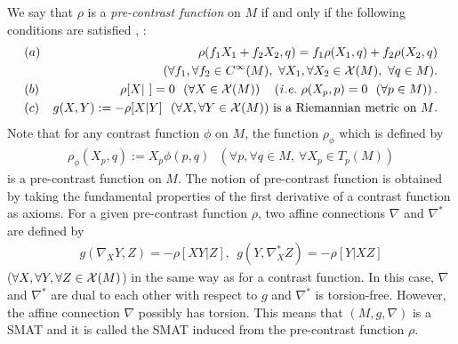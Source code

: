 \documentclass[graybox]{svmult}
\begin{document}
We say that $\rho$ is a {\em pre-contrast function} on $M$ if and only if the following
conditions are satisfied \cite{Ma2}, \cite{HM}:
%
\begin{eqnarray*}
   &(a)& \rho(f_1X_1+f_2X_2,q) = f_1\rho(X_1,q) + f_2\rho(X_2,q) \\
   && (\forall f_1, \forall f_2 \in C^{\infty}(M), \ \forall X_1, \forall X_2 \in {\cal X}(M), \ \forall q \in M). \\
   &(b)& \rho[X| \ ] = 0 \ \ (\forall X \in {\cal X}(M)) \ \ \
         \left({\it i.e.} \ \rho(X_p,p)=0 \ \ (\forall p \in M)\right). \\
   &(c)& \mbox{$g(X,Y) := -\rho[X|Y] \ \ (\forall X, \forall Y \in {\cal X}(M))$
               is a Riemannian metric on $M$}.
\end{eqnarray*}
%
Note that for any contrast function $\phi$ on $M$, the function $\rho_{\phi}$ which is defined by 
%
\begin{eqnarray*}
   \rho_{\phi}(X_p,q) := X_p\phi(p,q) \ \ \ (\forall p, \forall q \in M, \ \forall X_p \in T_p(M))
\end{eqnarray*}
%
is a pre-contrast function on $M$.
The notion of pre-contrast function is obtained by taking the fundamental properties of the first
derivative of a contrast function as axioms.
For a given pre-contrast function $\rho$, two affine connections $\nabla$ and $\nabla^{\ast}$ are
defined by
%
\begin{eqnarray*}
   g(\nabla_{X}Y,Z) = -\rho[XY|Z], \ \ g(Y,\nabla^{\ast}_{X}Z) = -\rho[Y|XZ]
\end{eqnarray*}
%
($\forall X, \forall Y, \forall Z \in {\cal X}(M)$) in the same way as for a contrast function.
In this case, $\nabla$ and $\nabla^{\ast}$ are dual to each other with respect to $g$ and
$\nabla^{\ast}$ is torsion-free. However, the affine connection $\nabla$ possibly has
torsion. This means that $(M,g,\nabla)$ is a SMAT and it is called the SMAT induced from
the pre-contrast function $\rho$.

\end{document}
